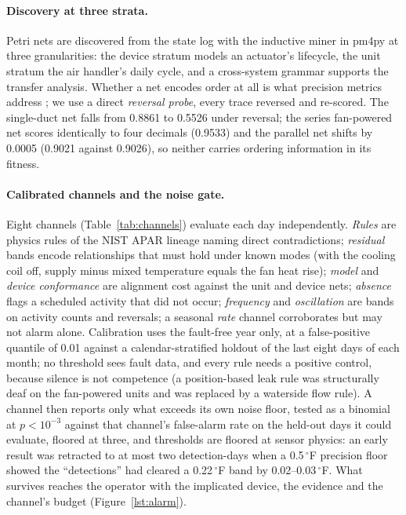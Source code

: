 \documentclass[11pt,letterpaper]{article}
\begin{document}
\paragraph{Discovery at three strata.} Petri nets are discovered from the state log with the inductive miner \cite{leemans2013inductiveminer,leemans2014inductiveminerinfrequent} in pm4py \cite{berti2023pm4py} at three granularities: the device stratum models an actuator's lifecycle, the unit stratum the air handler's daily cycle, and a cross-system grammar supports the transfer analysis. Whether a net encodes order at all is what precision metrics address \cite{munozgama2010precision,buijs2012quality,tax2018imprecisions,vandenbroucke2014negativeevents}; we use a direct \emph{reversal probe}, every trace reversed and re-scored. The single-duct net falls from 0.8861 to 0.5526 under reversal; the series fan-powered net scores identically to four decimals (0.9533) and the parallel net shifts by 0.0005 (0.9021 against 0.9026), so neither carries ordering information in its fitness.

\paragraph{Calibrated channels and the noise gate.} Eight channels (Table~\ref{tab:channels}) evaluate each day independently. \emph{Rules} are physics rules of the NIST APAR lineage naming direct contradictions; \emph{residual} bands encode relationships that must hold under known modes (with the cooling coil off, supply minus mixed temperature equals the fan heat rise); \emph{model} and \emph{device conformance} are alignment cost \cite{vanderaalst2012replaying,carmona2018conformancechecking} against the unit and device nets; \emph{absence} flags a scheduled activity that did not occur; \emph{frequency} and \emph{oscillation} are bands on activity counts and reversals; a seasonal \emph{rate} channel corroborates but may not alarm alone. Calibration uses the fault-free year only, at a false-positive quantile of 0.01 against a calendar-stratified holdout of the last eight days of each month; no threshold sees fault data, and every rule needs a positive control, because silence is not competence (a position-based leak rule was structurally deaf on the fan-powered units and was replaced by a waterside flow rule). A channel then reports only what exceeds its own noise floor, tested as a binomial at $p<10^{-3}$ against that channel's false-alarm rate on the held-out days it could evaluate, floored at three, and thresholds are floored at sensor physics: an early result was retracted to at most two detection-days when a 0.5\,$^\circ$F precision floor showed the ``detections'' had cleared a 0.22\,$^\circ$F band by 0.02--0.03\,$^\circ$F. What survives reaches the operator with the implicated device, the evidence and the channel's budget (Figure~\ref{lst:alarm}).
\end{document}
